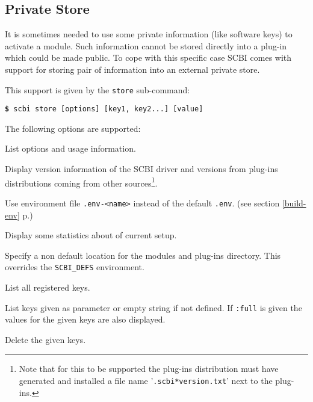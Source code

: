 \documentclass[a4paper,12pt,twoside]{article}
\newcommand{\code}[1]{\texttt{#1}}
\newcommand{\seeref}[1]{see section \ref{#1} p.\pageref{#1}}
\newcommand{\file}[1]{'{\texttt{#1}}'}
\newcommand{\cmd}[1]{\tabto{1cm}\hspace{0.5cm}\texttt{\textbf{\$} #1}}
\newcommand{\ddash}{-{}-}
\begin{document}
\subsection{Private Store}
\label{private store}
\label{store}

It is sometimes needed to use some private information (like software keys) to activate a module. Such information cannot be stored directly into a plug-in which could be made public. To cope with this specific case SCBI comes with support for storing pair of information into an external private store.

This support is given by the \code{store} sub-command:

\cmd{scbi store [options] [key1, key2...] [value]}

The following options are supported:

\begin{description}[font=\texttt]
	\item[-h | \ddash{}help] List options and usage information.

	\item[-v | \ddash{}version] Display version information of the SCBI driver and versions from plug-ins distributions coming from other sources\footnote{Note that for this to be supported the plug-ins distribution must have generated and installed a file name \file{.scbi*version.txt} next to the plug-ins.}.

	\item[-e | \ddash{}env=<name>] Use environment file \code{.env-<name>} instead of the default \code{.env}. (\seeref{build-env})

	\item[\ddash{}stat] Display some statistics about of current setup.

	\item[\ddash{}plugins=<directory>] Specify a non default location for the modules and plug-ins directory. This overrides the \code{SCBI\_DEFS} environment.

	\item[\ddash{}list-keys] List all registered keys.

	\item[\ddash{}list{[}:full{]}] List keys given as parameter or empty string if not defined. If \code{:full} is given the values for the given keys are also displayed.

	\item[-d | \ddash{}delete] Delete the given keys.
\end{description}
\end{document}

